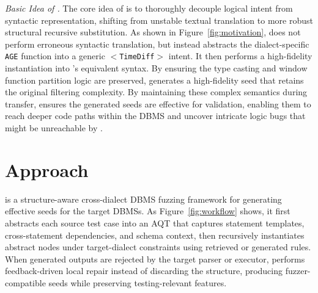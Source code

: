 \documentclass[conference]{IEEEtran}
\begin{document}
\textit{Basic Idea of \tool{}.}
The core idea of \tool{} is to thoroughly decouple logical intent from syntactic representation, shifting from unstable textual translation to more robust structural recursive substitution. 
As shown in Figure~\ref{fig:motivation}, \tool{} does not perform erroneous syntactic translation, but instead abstracts the dialect-specific \texttt{AGE} function into a generic $<$\texttt{TimeDiff}$>$ intent. 
It then performs a high-fidelity instantiation into \duckdb{}’s equivalent syntax. By ensuring the type casting and window function partition logic are preserved, \tool{} generates a high-fidelity seed that retains the original filtering complexity. 
By maintaining these complex semantics during transfer, \tool{} ensures the generated seeds are effective for validation, enabling them to reach deeper code paths within the DBMS and uncover intricate logic bugs that might be unreachable by \sedar{}.
\section{Approach}
\label{sec:approach}

\tool{} is a structure-aware cross-dialect DBMS fuzzing framework for generating effective seeds for the target DBMSs.
As Figure~\ref{fig:workflow} shows, 
it first abstracts each source test case into an AQT that captures statement templates, cross-statement dependencies, and schema context, then recursively instantiates abstract nodes under target-dialect constraints using retrieved or generated rules.
When generated outputs are rejected by the target parser or executor, \tool{} performs feedback-driven local repair instead of discarding the structure, producing fuzzer-compatible seeds while preserving testing-relevant features.
\end{document}
